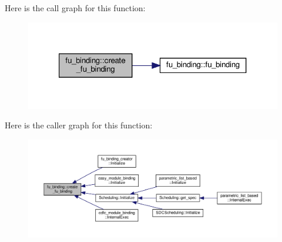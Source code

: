Here is the call graph for this function\+:
\nopagebreak
\begin{figure}[H]
\begin{center}
\leavevmode
\includegraphics[width=321pt]{d8/d04/classfu__binding_a81b205a4f6b735fcd971cf3315c85e14_cgraph}
\end{center}
\end{figure}
Here is the caller graph for this function\+:
\nopagebreak
\begin{figure}[H]
\begin{center}
\leavevmode
\includegraphics[width=350pt]{d8/d04/classfu__binding_a81b205a4f6b735fcd971cf3315c85e14_icgraph}
\end{center}
\end{figure}
\mbox{\label{classfu__binding_ac16197a1e3dd209aee9a4f35b1654d6c}} 
